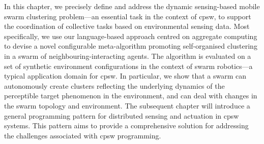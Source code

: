 In this chapter, we precisely define and address
 the dynamic sensing-based mobile swarm clustering problem---an essential task in the context of \ac{cpsw}, to support the coordination of collective tasks based on environmental sensing data.
%
Most specifically,
 we use our language-based approach centred on aggregate computing to devise 
 a novel configurable meta-algorithm
 promoting self-organised clustering in a swarm
 of neighbouring-interacting agents.
%
The algorithm is evaluated on a set of synthetic environment configurations
 in the context of swarm robotics---a typical application domain for \ac{cpsw}.
%
In particular, we show that a swarm can autonomously
 create clusters reflecting the underlying dynamics of the  perceptible target phenomenon in the environment,
 and can deal with changes in the swarm topology and environment.
%
The subsequent chapter will introduce a general programming pattern for distributed sensing and actuation in \ac{cpsw} systems. 
 This pattern aims to provide a comprehensive solution for addressing the challenges associated with \ac{cpsw} programming.

